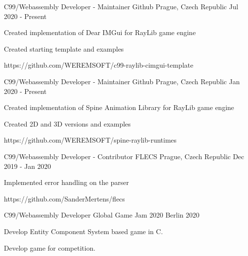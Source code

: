 

\begin{cventries}

 \cventry
  {C99/Webassembly Developer - Maintainer} %
  {Github} %
  {Prague, Czech Republic} %
  {Jul 2020 - Present} %
  {
  \begin{cvitems} %
      \item {Created implementation of Dear IMGui for RayLib game engine}
      \item {Created starting template and examples}
      \item {https://github.com/WEREMSOFT/c99-raylib-cimgui-template}
  \end{cvitems}
  }
  \cventry
  {C99/Webassembly Developer - Maintainer} %
  {Github} %
  {Prague, Czech Republic} %
  {Jan 2020 - Present} %
  {
  \begin{cvitems} %
      \item {Created implementation of Spine Animation Library for RayLib game engine}
      \item {Created 2D and 3D versions and examples}
      \item {https://github.com/WEREMSOFT/spine-raylib-runtimes}
  \end{cvitems}
  }
  \cventry
  {C99/Webassembly Developer - Contributor} %
  {FLECS} %
  {Prague, Czech Republic} %
  {Dec 2019 - Jan 2020} %
  {
  \begin{cvitems} %
      \item {Implemented error handling on the parser}
      \item {https://github.com/SanderMertens/flecs}
  \end{cvitems}
  }

  \cventry
  {C99/Webassembly Developer} %
  {Global Game Jam 2020} %
  {Berlin} %
  {2020} %
  {
  \begin{cvitems} %
    \item {Develop Entity Component System based game in C.}
    \item {Develop game for competition.}
  \end{cvitems}
  }



\end{cventries}
